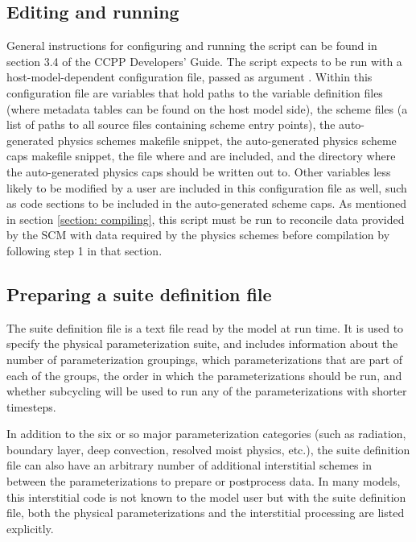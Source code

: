 \subsection{Editing and running }

General instructions for configuring and running the  script can be found in section 3.4 of the CCPP Developers' Guide. The script expects to be run with a host-model-dependent configuration file, passed as argument . Within this configuration file are variables that hold paths to the variable definition files (where metadata tables can be found on the host model side), the scheme files (a list of paths to all source files containing scheme entry points), the auto-generated physics schemes makefile snippet, the auto-generated physics scheme caps makefile snippet, the file where  and  are included, and the directory where the auto-generated physics caps should be written out to. Other variables less likely to be modified by a user are included in this configuration file as well, such as code sections to be included in the auto-generated scheme caps. As mentioned in section \ref{section: compiling}, this script must be run to reconcile data provided by the SCM with data required by the physics schemes before compilation by following step 1 in that section.

\subsection{Preparing a suite definition file}
The suite definition file is a text file read by the model at run time. It is used to specify the physical parameterization suite, and includes information about the number of parameterization groupings, which parameterizations that are part of each of the groups, the order in which the parameterizations should be run, and whether subcycling will be used to run any of the parameterizations with shorter timesteps.

In addition to the six or so major parameterization categories (such as radiation, boundary layer, deep convection, resolved moist physics, etc.), the suite definition file can also have an arbitrary number of additional interstitial schemes in between the parameterizations to prepare or postprocess data. In many models, this interstitial code is not known to the model user but with the suite definition file, both the physical parameterizations and the interstitial processing are listed explicitly.

